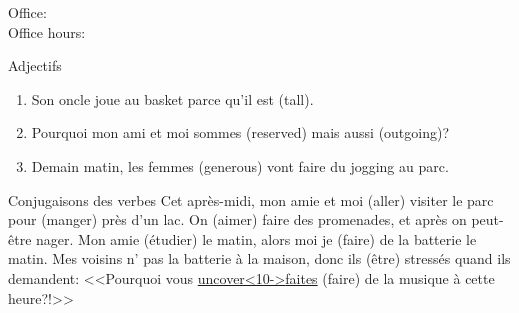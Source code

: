 \documentclass{beamer}
\subtitle[Révision: Examen 1]{La révision pour l'examen 1}
\begin{document}
  \begin{frame}
    \titlepage
    \tiny{Office: \\
          Office hours: }
  \end{frame}

  \begin{frame}{}
  \end{frame}

  \begin{frame}{}
  \end{frame}

  \begin{frame}{Adjectifs}
    \begin{enumerate}
      \item Son oncle joue au basket parce qu'il est \underline{} (tall).
      \item Pourquoi mon ami et moi sommes \underline{} (reserved) mais aussi \underline{} (outgoing)?
      \item Demain matin, les femmes \underline{} (generous) vont faire du jogging au parc.
    \end{enumerate}
  \end{frame}

  \begin{frame}{Conjugaisons des verbes}
    Cet après-midi, mon amie et moi \underline{} (aller) visiter le parc pour \underline{} (manger) près d'un lac.
    On \underline{} (aimer) faire des promenades, et après on \underline{} peut-être nager.
    Mon amie \underline{} (étudier) le matin, alors moi je \underline{} (faire) de la batterie le matin.
    Mes voisins n'\underline{} pas la batterie à la maison, donc ils \underline{} (être) stressés quand ils demandent: <<Pourquoi vous \underline{uncover<10->{faites}} (faire) de la musique à cette heure?!>>
  \end{frame}
\end{document}
